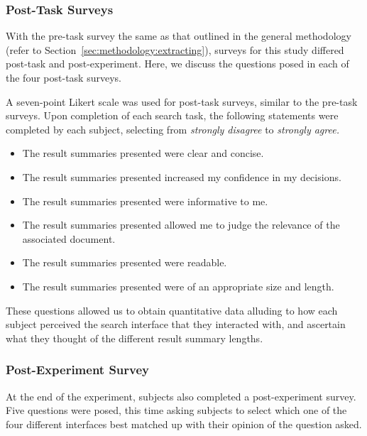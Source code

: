 \subsubsection{Post-Task Surveys}\label{sec:snippets:method:posttask}
With the pre-task survey the same as that outlined in the general methodology (refer to Section~\ref{sec:methodology:extracting}), surveys for this study differed post-task and post-experiment. Here, we discuss the questions posed in each of the four post-task surveys.

A seven-point Likert scale was used for post-task surveys, similar to the pre-task surveys. Upon completion of each search task, the following statements were completed by each subject, selecting from \emph{strongly disagree} to \emph{strongly agree.}

\begin{itemize}
    \item{ The result summaries presented were clear and concise.}
    \item{ The result summaries presented increased my confidence in my decisions.}
    \item{ The result summaries presented were informative to me.}
    \item{ The result summaries presented allowed me to judge the relevance of the associated document.}
    \item{ The result summaries presented were readable.}
    \item{ The result summaries presented were of an appropriate size and length.}
\end{itemize}

These questions allowed us to obtain quantitative data alluding to how each subject perceived the search interface that they interacted with, and ascertain what they thought of the different result summary lengths.

\subsubsection{Post-Experiment Survey}\label{sec:snippets:method:postexperiment}
At the end of the experiment, subjects also completed a post-experiment survey. Five questions were posed, this time asking subjects to select which one of the four different interfaces best matched up with their opinion of the question asked.

